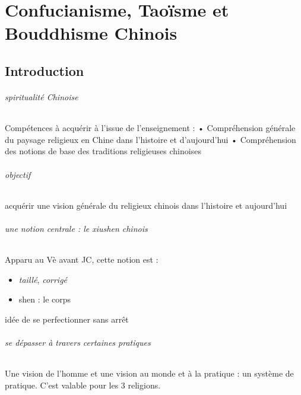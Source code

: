\part{Confucianisme, Taoïsme et Bouddhisme Chinois}
\chapter{Introduction}


\paragraph{spiritualité Chinoise}
Compétences à acquérir à l’issue de l’enseignement :
•	Compréhension générale du paysage religieux en Chine dans l’histoire et d’aujourd’hui
•	Compréhension des notions de base des traditions religieuses chinoises

\paragraph{objectif } acquérir une vision générale du religieux chinois dans l'histoire et aujourd'hui


\paragraph{une notion centrale : le xiushen chinois}

\begin{Def}[xiushen]
    Apparu au Vè avant JC, cette notion est :
    \begin{itemize}
        \item \textit{taillé}, \textit{corrigé}
        \item shen : le corps
    \end{itemize}
    idée de se perfectionner sans arrêt
\end{Def}

\paragraph{se dépasser à travers certaines pratiques}
Une vision de l'homme et une vision au monde et à la pratique : un système de pratique. C'est valable pour les 3 religions. 

